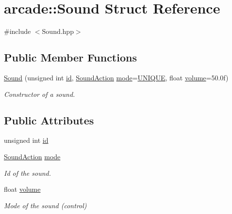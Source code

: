 \hypertarget{structarcade_1_1_sound}{}\section{arcade\+:\+:Sound Struct Reference}
\label{structarcade_1_1_sound}


{\ttfamily \#include $<$Sound.\+hpp$>$}

\subsection*{Public Member Functions}
\begin{DoxyCompactItemize}
\item 
\hyperlink{structarcade_1_1_sound_a52388728d9750d6f9aee13b19b4b8427}{Sound} (unsigned int \hyperlink{structarcade_1_1_sound_a9bee48a44860d44ddb963621ceb9172b}{id}, \hyperlink{namespacearcade_a31ef30225775697d1aeaf59819ac5051}{Sound\+Action} \hyperlink{structarcade_1_1_sound_a67fc0884cb4d9445ad6c9d9a241a15ef}{mode}=\hyperlink{namespacearcade_a31ef30225775697d1aeaf59819ac5051a0dcacdf4484296a70e9bb6fabe7e3b8a}{U\+N\+I\+Q\+UE}, float \hyperlink{structarcade_1_1_sound_aa80e8832313b76cefcf2e866c4a2e1cc}{volume}=50.\+0f)
\begin{DoxyCompactList}\small\item\em Constructor of a sound. \end{DoxyCompactList}\end{DoxyCompactItemize}
\subsection*{Public Attributes}
\begin{DoxyCompactItemize}
\item 
unsigned int \hyperlink{structarcade_1_1_sound_a9bee48a44860d44ddb963621ceb9172b}{id}
\item 
\hyperlink{namespacearcade_a31ef30225775697d1aeaf59819ac5051}{Sound\+Action} \hyperlink{structarcade_1_1_sound_a67fc0884cb4d9445ad6c9d9a241a15ef}{mode}
\begin{DoxyCompactList}\small\item\em Id of the sound. \end{DoxyCompactList}\item 
float \hyperlink{structarcade_1_1_sound_aa80e8832313b76cefcf2e866c4a2e1cc}{volume}
\begin{DoxyCompactList}\small\item\em Mode of the sound (control) \end{DoxyCompactList}\end{DoxyCompactItemize}


